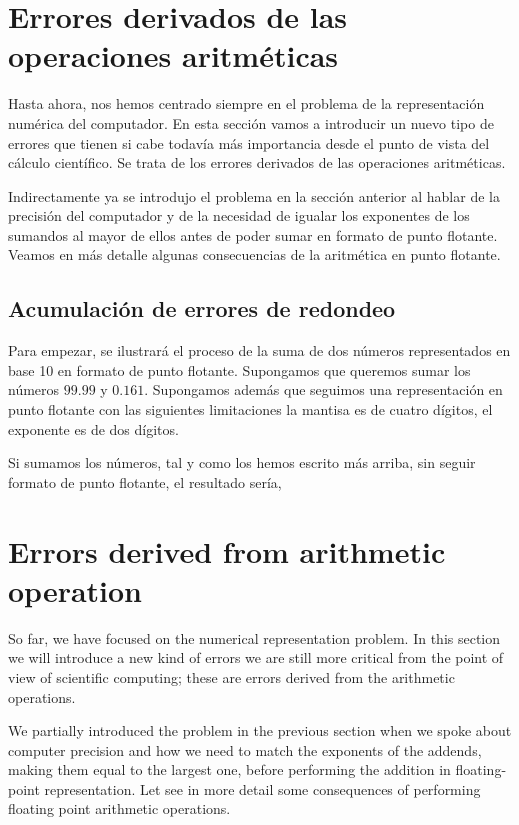 \begin{paracol}{2}
\section{Errores derivados de las operaciones aritméticas}
Hasta ahora, nos hemos centrado siempre en el problema de la representación numérica del computador. En esta sección vamos a introducir un nuevo tipo de errores que tienen si cabe todavía más importancia desde el punto de vista del cálculo científico. Se trata de los errores derivados de las operaciones aritméticas.

Indirectamente ya se introdujo el problema en la sección anterior al hablar de la precisión del computador y de la necesidad de igualar los exponentes de los sumandos al mayor de ellos antes de poder sumar en formato de punto flotante. Veamos en más detalle algunas consecuencias de la aritmética en punto flotante.
\subsection{Acumulación de errores de redondeo}

Para empezar, se ilustrará el proceso de la suma de dos números representados en base 10 en formato de punto flotante. Supongamos que queremos sumar los números $99.99$ y $0.161$. Supongamos además que seguimos una representación en punto flotante con las siguientes limitaciones la mantisa es de cuatro dígitos, el exponente es de dos dígitos.

Si sumamos los números, tal y como los hemos escrito más arriba, sin seguir formato de punto flotante, el resultado sería,
\switchcolumn
\section{Errors derived from arithmetic operation}
So far, we have focused on the numerical representation problem. In this section we will introduce a new kind of errors we are still more critical from the point of view of scientific computing; these are errors derived from the arithmetic operations.

We partially introduced the problem in the previous section when we spoke about computer precision and how we need to match the exponents of the addends, making them equal to the largest one, before performing the addition in floating-point representation. Let see in more detail some consequences of performing floating point arithmetic operations.

\end{paracol}
